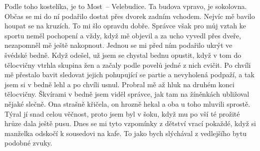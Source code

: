 
Podle toho kostelíka, je to Most~-- Velebudice. Ta budova vpravo, je
sokolovna. Občas se mi do ní podařilo dostat přes dvorek zadním
vchodem. Nejvíc mě bavilo houpat se na kruzích. To mi šlo opravdu
dobře. Správce však pro můj vztah ke sportu neměl pochopení a vždy,
když mě objevil a za ucho vyvedl přes dveře, nezapomněl mě ještě
nakopnout. Jednou se mi před ním podařilo ukrýt ve švédské bedně. Když
odešel, už jsem se chystal bednu opustit, když v tom do tělocvičny
vtrhla skupina žen a začaly podle povelů jedné z nich cvičit. Po
chvíli mě přestalo bavit sledovat jejich pohupující se partie a
nevyholená podpaží, a tak jsem si v bedně lehl a po chvíli usnul.
Probral mě až hluk na druhém konci tělocvičny. Škvírami v bedně jsem
viděl správce, jak tam na žíněnkách ubližoval nějaké slečně. Ona
strašně křičela, on hrozně hekal a oba u toho mluvili sprostě. Týral
jí snad celou věčnost, proto jsem byl v šoku, když mu po vší té
prožité hrůze dala ještě pusu. Dnes se mi tyto vzpomínky z dětství
vrací pokaždé, když si manželka odskočí k sousedovi na kafe. To jako
bych slýchával z vedlejšího bytu podobné zvuky.

